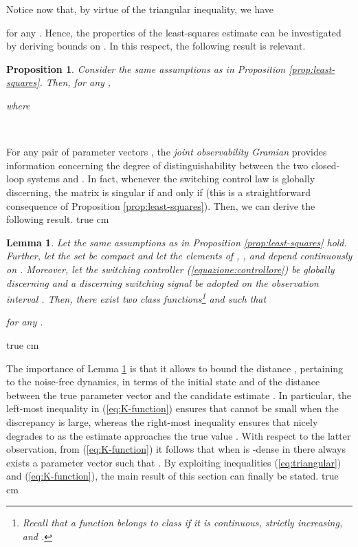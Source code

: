 \documentclass[letterpaper, 10 pt, conference]{ieeetran}
\def\qedp{\hspace*{\fill}~{\tiny }}
\def\salt{\vskip 0.2 true cm}
\newtheorem{itlemma}{Lemma}
\newtheorem{itproposition}{Proposition}
\newenvironment{proposition}{\begin{itproposition}\rm}{\end{itproposition}}
\newenvironment{lemma}{\begin{itlemma}\rm}{\end{itlemma}}
\begin{document}
Notice now that, by virtue of the triangular inequality, we have

for any . Hence, the properties of the least-squares estimate  can be investigated by deriving bounds on .
In this respect, the following result is relevant. 

\begin{proposition}
Consider the same assumptions as in Proposition \ref{prop:least-squares}. Then, for any 
,

where

\qedp
\end{proposition}

For any pair of parameter vectors , the {\em joint observability Gramian}  provides information concerning
the degree of distinguishability between the two closed-loop systems  and . In fact,
whenever the switching control law  is globally discerning, the matrix  is singular if and only if 
(this is a straightforward consequence of Proposition \ref{prop:least-squares}). Then,
we can derive the following result. \salt

\begin{lemma}\label{lemma:K-function}
Let the same assumptions as in Proposition \ref{prop:least-squares} hold. Further, let the set  be compact and let the elements of , , and  depend continuously on . 
Moreover, let the switching controller (\ref{equazione:controllore}) be globally discerning and
a discerning switching signal  be adopted on the observation interval . Then, there exist two class  functions\footnote{Recall
that a function  belongs to class  if it is continuous, strictly increasing, and .}  
and  such that

for any .
\qedp
\end{lemma}\salt

The importance of Lemma \ref{lemma:K-function} is that it allows to bound the distance , pertaining to the noise-free dynamics,
in terms of the initial state  and of the distance between the true parameter vector  and the candidate estimate . In particular, the left-most inequality in
(\ref{eq:K-function}) ensures that  cannot be small when the discrepancy  is large, whereas the right-most inequality
ensures that  nicely degrades to  as the estimate  approaches the true value . With respect to the latter observation,
from (\ref{eq:K-function}) it follows that when   is -dense in  there always exists a parameter vector  such that
. By exploiting inequalities (\ref{eq:triangular}) and (\ref{eq:K-function}), the main result of this section can finally be stated.
\salt
\end{document}
